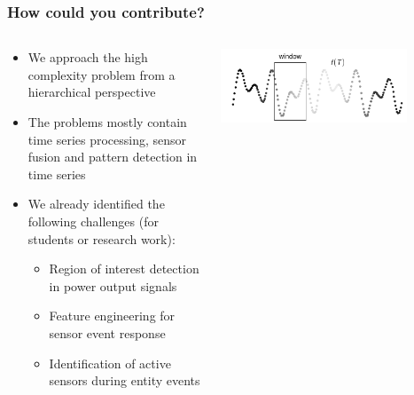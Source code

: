 \begin{frame}
	\frametitle{How could you contribute?}
	\begin{columns}
		\begin{column}{0.6\textwidth}
			\begin{itemize}
				\item We approach the high complexity problem from a hierarchical perspective
				\item The problems mostly contain time series processing, sensor fusion and pattern detection in time series
				\item We already identified the following challenges (for students or research work):
				      \begin{itemize}
					      \item Region of interest detection in power output signals
					      \item Feature engineering for sensor event response
					      \item Identification of active sensors during entity events
				      \end{itemize}
			\end{itemize}
		\end{column}
		\begin{column}{0.4\textwidth}
			\vspace*{\fill}
			\begin{flushright}
				\includegraphics[width=0.8\textwidth]{img/research/ROIselection.png}
			\end{flushright}
			\vspace*{\fill}
		\end{column}
	\end{columns}
\end{frame}
